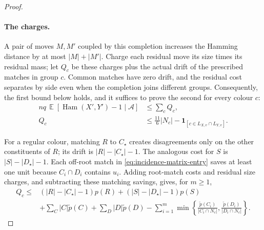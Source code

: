 \documentclass[11pt,reqno]{article}
\theoremstyle{plain}
\theoremstyle{definition}
\theoremstyle{remark}
\theoremstyle{definition}
\theoremstyle{remark}
\newcommand{\one}[1]{\mathbf{1}_{\left[#1\right]}}   %
\DeclareMathOperator{\E}{\mathbb{E}}
\DeclareMathOperator{\Ham}{Ham}
\begin{document}
\begin{proof}
\paragraph{The charges.}
A pair of moves \(M,M'\) coupled by this completion increases the
Hamming distance by at most \(|M|+|M'|\).  Charge each residual move its size times its residual mass;
let \(Q_c\) be these charges plus the actual drift of the prescribed
matches in group \(c\).  Common matches have zero drift, and the residual
cost separates by side even when the completion joins different groups.
Consequently, the first bound below holds, and it suffices to prove the
second for every colour \(c\):
\begin{align}
  nq\,\E[\Ham(X',Y')-1\mid\mathcal A]&\le\sum_cQ_c,
    \label{eq:cert-ham}\\
  Q_c&\le\frac{11}{6}|N_c|-\one{c\in L_{X,v}\cap L_{Y,v}}.
    \label{eq:cert-bound}
\end{align}

For a regular colour, matching \(R\) to \(C_\star\) creates
disagreements only on the other constituents of \(R\); its drift is
\(|R|-|C_\star|-1\).  The analogous cost for \(S\) is
\(|S|-|D_\star|-1\).  Each off-root match in
\eqref{eq:incidence-matrix-entry} saves at least one unit because
\(C_i\cap D_i\) contains \(u_i\).  Adding root-match costs and residual
size charges, and subtracting these matching savings, gives, for \(m\ge1\),
\begin{equation}\label{eq:regular-colour-charge}
\begin{aligned}
 Q_c\le{}&(|R|-|C_\star|-1)p(R)+(|S|-|D_\star|-1)p(S)\\
 &+\sum_C|C|\tilde p(C)+\sum_D|D|\tilde p(D)
 -\sum_{i=1}^m
   \min\left\{\frac{\tilde p(C_i)}{|C_i\cap N_c|},
                    \frac{\tilde p(D_i)}{|D_i\cap N_c|}\right\}.
\end{aligned}
\end{equation}


\end{proof}
\end{document}
